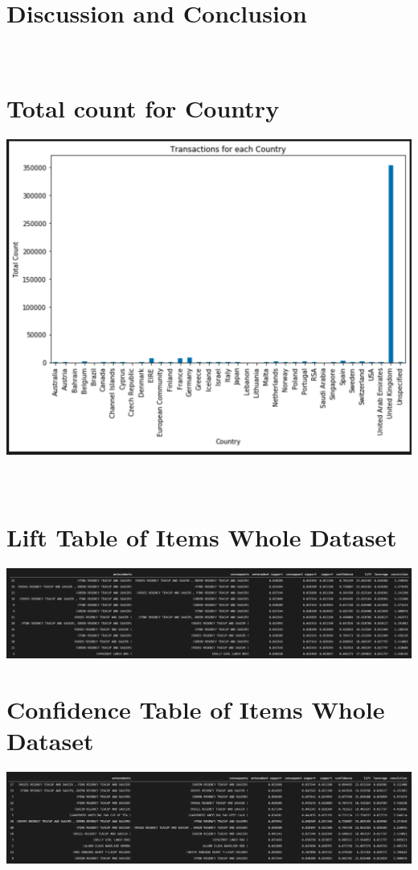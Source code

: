 \documentclass[a4paper,10pt]{article}
\begin{document}
\section{Discussion and Conclusion}



\medskip
\newpage
\begin{appendices}
	\section{\\Total count for Country}
	\label{appendix:totalcountall}
	\includegraphics[scale=0.5]{totalcount}
	
	\section{\\Lift Table of Items Whole Dataset}
	\label{appendix:wholelift}
	\includegraphics[scale=0.2]{wholelift}
	
	\section{Confidence Table of Items Whole Dataset}
	\label{appendix:wholeconf}
	\includegraphics[scale=0.2]{wholeconf}
	
\end{appendices}

\newpage



\end{document}
